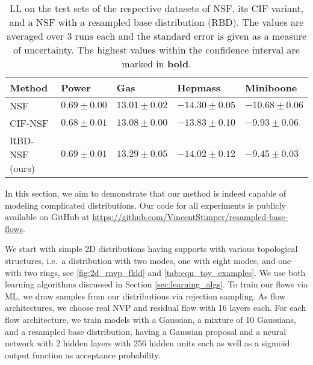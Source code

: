 \documentclass[twoside]{article}
\begin{document}
\begin{table*}[t]
  \caption{LL on the test sets of the respective datasets of NSF, its CIF variant, and a NSF with a resampled base distribution (RBD). The values are averaged over 3 runs each and the standard error is given as a measure of uncertainty. The highest values within the confidence interval are marked in \textbf{bold}.}
  \label{tab:uci_ll}
  \centering
  \vspace{0.3cm}
  \begin{tabular}{l|llll}
    Method & Power & Gas & Hepmass & Miniboone \\
    \hline
    NSF & $\mathbf{0.69\pm0.00}$ & $13.01\pm0.02$ & $-14.30\pm0.05$ & $-10.68\pm0.06$ \\
    CIF-NSF & $\mathbf{0.68\pm0.01}$ & $13.08\pm0.00$ & $\mathbf{-13.83\pm0.10}$ & $-9.93\pm0.06$ \\
    RBD-NSF (ours) & $\mathbf{0.69\pm0.01}$ & $\mathbf{13.29\pm0.05}$ & $\mathbf{-14.02\pm0.12}$ & $\mathbf{-9.45\pm0.03}$
  \end{tabular}
\end{table*}

In this section, we aim to demonstrate that our method is indeed capable of modeling complicated distributions. Our code for all experiments is publicly available on GitHub at \url{https://github.com/VincentStimper/resampled-base-flows}.

We start with simple 2D distributions having supports with various topological structures, i.e.\ a distribution with two modes, one with eight modes, and one with two rings, see \autoref{fig:2d_rnvp_fkld} and \autoref{tab:equ_toy_examples}. We use both learning algorithms discussed in Section \ref{sec:learning_algs}. To train our flows via ML, we draw samples from our distributions via rejection sampling. As flow architectures, we choose real NVP \citep{Dinh2017} and residual flow \citep{Behrmann2019,Chen2019a} with 16 layers each. For each flow architecture, we train models with a Gaussian, a mixture of 10 Gaussians, and a resampled base distribution, having a Gaussian proposal and a neural network with 2 hidden layers with 256 hidden units each as well as a sigmoid output function as acceptance probability. 
\end{document}
